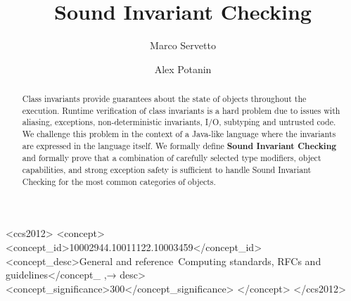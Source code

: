 \documentclass[english,submission]{programming}
\theoremstyle{plain}
\begin{document}
\title{Sound Invariant Checking}
\author{Marco Servetto}
\author{Alex Potanin}

\begin{CCSXML}
<ccs2012>
<concept>
<concept_id>10002944.10011122.10003459</concept_id>
<concept_desc>General and reference~Computing standards, RFCs and guidelines</concept_
,→ desc>
<concept_significance>300</concept_significance>
</concept>
</ccs2012>
\end{CCSXML}
\maketitle
\begin{abstract}
Class invariants provide guarantees about the state of objects throughout the execution.
Runtime verification of class invariants is
a hard problem due to issues with aliasing, exceptions,
non-deterministic invariants, I/O, subtyping and untrusted code.
We challenge this problem in the context of
a Java-like language where the invariants are expressed in the language itself.
We formally define \textbf{Sound Invariant Checking}
and formally prove that a combination of carefully selected type modifiers, object capabilities,
 and strong exception safety is sufficient
to handle Sound Invariant Checking for the most common categories of objects.

\end{abstract}










%

\end{document}
